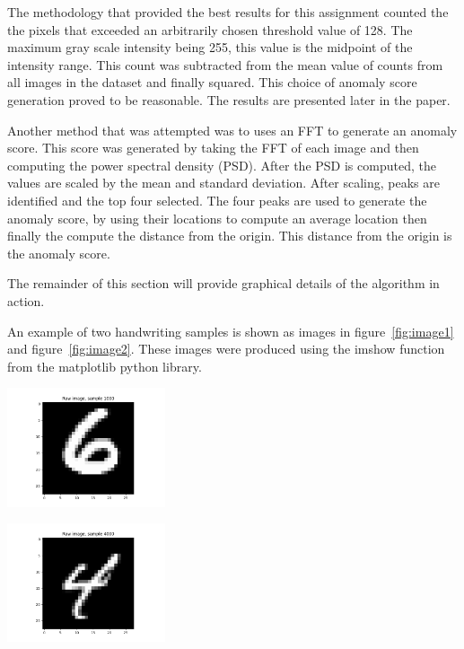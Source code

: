 The methodology that provided the best results for this assignment counted the the pixels that exceeded an arbitrarily chosen threshold value of 128. 
The maximum gray scale intensity being 255, this value is the midpoint of the intensity range. 
This count was subtracted from the mean value of counts from all images in the dataset and finally squared. 
This choice of anomaly score generation proved to be reasonable. The results are presented later in the paper. 

Another method that was attempted was to uses an FFT to generate an anomaly score. This score was generated by taking the FFT of each image and then computing the power spectral density (PSD). 
After the PSD is computed, the values are scaled by the mean and standard deviation. After scaling, peaks are identified and the top four selected.
The four peaks are used to generate the anomaly score, by using their locations to compute an average location then finally the compute the distance from the origin.
This distance from the origin is the anomaly score.  

The remainder of this section will provide graphical details of the algorithm in action.

An example of two handwriting samples is shown as images in figure~\ref{fig:image1} and figure~\ref{fig:image2}. These images were produced using the imshow function from the matplotlib python library.\newline

\begin{center}
\includegraphics[width=0.35\textwidth]{image1.png}
\end{center}

\begin{center}
\includegraphics[width=0.35\textwidth]{image2.png}
\end{center}

